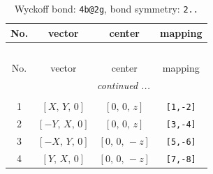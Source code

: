 \documentclass[fleqn,8pt]{jsarticle}
\begin{document}
\renewcommand{\arraystretch}{1.2}
\begin{longtable}{cccc}
\caption{Wyckoff bond: {\tt 4b@2g}, bond symmetry: {\tt 2..}}
 \\
 \hline \hline
No. & vector & center & mapping \\ \hline \endfirsthead

\multicolumn{3}{l}{\tablename\ \thetable{}} \\
 \hline \hline
No. & vector & center & mapping \\ \hline \endhead

 \hline \hline
\multicolumn{3}{r}{\footnotesize\it continued ...} \\ \endfoot

 \hline \hline
\multicolumn{3}{r}{} \\ \endlastfoot

1 & $\left[ X,\, Y,\, 0 \right]$ & $\left[ 0,\, 0,\, z \right]$ & {\tt [1,-2]} \\ \hline
2 & $\left[ - Y,\, X,\, 0 \right]$ & $\left[ 0,\, 0,\, z \right]$ & {\tt [3,-4]} \\ \hline
3 & $\left[ - X,\, Y,\, 0 \right]$ & $\left[ 0,\, 0,\, - z \right]$ & {\tt [5,-6]} \\ \hline
4 & $\left[ Y,\, X,\, 0 \right]$ & $\left[ 0,\, 0,\, - z \right]$ & {\tt [7,-8]} \\
\end{longtable}
\renewcommand{\arraystretch}{1.2}
\end{document}
